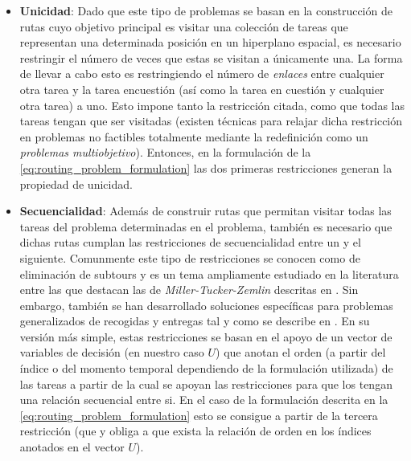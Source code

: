 \documentclass{subfiles}
\begin{document}
        \begin{itemize}

          \item \textbf{Unicidad}: Dado que este tipo de problemas se basan en la construcción de rutas cuyo objetivo principal es visitar una colección de tareas que representan una determinada posición en un hiperplano espacial, es necesario restringir el número de veces que estas se visitan a únicamente una. La forma de llevar a cabo esto es restringiendo el número de \emph{enlaces} entre cualquier otra tarea y la tarea encuestión (así como la tarea en cuestión y cualquier otra tarea) a uno. Esto impone tanto la restricción citada, como que todas las tareas tengan que ser visitadas (existen técnicas para relajar dicha restricción en problemas no factibles totalmente mediante la redefinición como un \emph{problemas multiobjetivo}). Entonces, en la formulación de la \cref{eq:routing_problem_formulation} las dos primeras restricciones generan la propiedad de unicidad.

          \item \textbf{Secuencialidad}: Además de construir rutas que permitan visitar todas las tareas del problema determinadas en el problema, también es necesario que dichas rutas cumplan las restricciones de secuencialidad entre un  y el siguiente. Comunmente este tipo de restricciones se conocen como de eliminación de subtours y es un tema ampliamente estudiado en la literatura entre las que destacan las de \emph{Miller-Tucker-Zemlin} descritas en \cite{miller1960integer}. Sin embargo, también se han desarrollado soluciones específicas para problemas generalizados de recogidas y entregas tal y como se describe en \cite{desrochers1991improvements}. En su versión más simple, estas restricciones se basan en el apoyo de un vector de variables de decisión (en nuestro caso $U$) que anotan el orden (a partir del índice o del momento temporal dependiendo de la formulación utilizada) de las tareas a partir de la cual se apoyan las restricciones para que los  tengan una relación secuencial entre si. En el caso de la formulación descrita en la \cref{eq:routing_problem_formulation} esto se consigue a partir de la tercera restricción (que  y obliga a que exista la relación de orden en los índices anotados en el vector $U$).

        \end{itemize}
\end{document}
